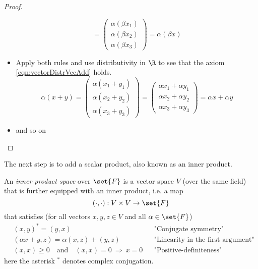 \begin{proof}
\begin{itemize}
\begin{equation}
					= \left( \begin{array}{c} \alpha (\beta x_1) \\ \alpha (\beta x_2) \\ \alpha (\beta x_3) \end{array} \right)
					= \alpha (\beta x)
				\label{eqn:vectorEuclidProofComp}
			\end{equation}
		\item Apply both rules and use distributivity in $\R$ to see that the axiom \eqref{eqn:vectorDistrVecAdd} holds.
			\begin{equation}
				\alpha (x + y) = \left( \begin{array}{c} \alpha (x_1 + y_1) \\ \alpha (x_2 + y_2) \\ \alpha (x_3 + y_3) \end{array} \right)
					= \left( \begin{array}{c} \alpha x_1 + \alpha y_1 \\ \alpha x_2 + \alpha y_2 \\ \alpha x_3 + \alpha y_3 \end{array} \right)
					= \alpha x + \alpha y
				\label{eqn:vectorEuclidProofDist}
			\end{equation}
		\item and so on 
	\end{itemize}
\end{proof}


\noindent
The next step is to add a scalar product, also known as an inner product.
\begin{defn}
	An \emph{inner product space} over $\set{F}$ is a vector space $V$ (over the same field) that is further equipped with an inner product, i.e. a map
	\[ (\cdot,\cdot) : V \times V \to \set{F} \]
	that satisfies (for all vectors $x,y,z \in V$ and all $\alpha \in \set{F}$)
	\begin{align}
		\label{eqn:innProdConjSym}  &(x,y)^\ast = (y,x) &&                                                 \text{"Conjugate symmetry"} \\
		\label{eqn:innProdLinLeft}  &(\alpha x + y,z) = \alpha (x,z) + (y,z) &&                            \text{"Linearity in the first argument"} \\
		\label{eqn:innProdPosDef}   &(x,x) \ge 0 \quad \text{and} \quad (x,x) = 0 ~\Rightarrow~ x = 0  &&  \text{"Positive-definiteness"}
	\end{align}
	here the asterisk $^\ast$ denotes complex conjugation.
\end{defn}

